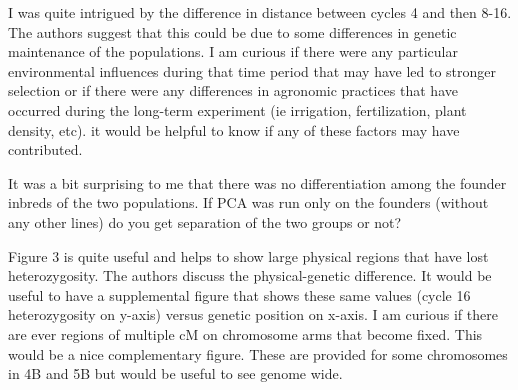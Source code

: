 \documentclass[onecolumn,oneside,letterpaper]{article}
\begin{document}

I was quite intrigued by the difference in distance between cycles 4 and then 8-16.  The authors suggest that this could be due to some differences in genetic maintenance of the populations.  I am curious if there were any particular environmental influences during that time period that may have led to stronger selection or if there were any differences in agronomic practices that have occurred during the long-term experiment (ie irrigation, fertilization, plant density, etc).  it would be helpful to know if any of these factors may have contributed.


It was a bit surprising to me that there was no differentiation among the founder inbreds of the two populations.  If PCA was run only on the founders (without any other lines) do you get separation of the two groups or not?


Figure 3 is quite useful and helps to show large physical regions that have lost heterozygosity.  The authors discuss the physical-genetic difference.  It would be useful to have a supplemental figure that shows these same values (cycle 16 heterozygosity on y-axis) versus genetic position on x-axis.  I am curious if there are ever regions of multiple cM on chromosome arms that become fixed.  This would be a nice complementary figure.  These are provided for some chromosomes in 4B and 5B but would be useful to see genome wide.  

\end{document}
